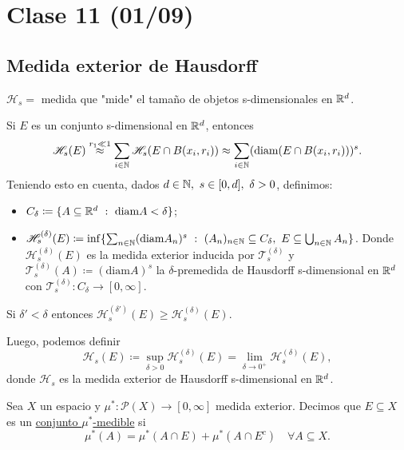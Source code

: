 \section{Clase 11 (01/09)}

\subsection*{Medida exterior de Hausdorff}

$\mathscr{H}_s =$ medida que "mide" el tamaño de objetos s-dimensionales en $\mathbb{R}^d$. \newline

Si $E$ es un conjunto s-dimensional en $\mathbb{R}^d$, entonces
\[
	\mathscr{H}_s (E) \stackrel{r_1 \ll 1}{\approx} \sum_{i\in\mathbb{N}} \mathscr{H}_s(E \cap B(x_i,r_i)) \approx \sum_{i\in\mathbb{N}} (\text{diam}(E \cap B(x_i,r_i)))^s
.\] 
Teniendo esto en cuenta, dados $d \in \mathbb{N},\ s \in [0,d],\ \delta > 0$, definimos:
\begin{itemize}
	\item $C_{\delta} \coloneq \{ A \subseteq \mathbb{R}^d \ : \ \text{diam}A < \delta \}$;

	\item $\mathscr{H}_{s}^{(\delta)} (E) \coloneq \inf \{ \sum_{n\in\mathbb{N}} (\text{diam}A_n)^s \ : \ (A_n)_{n\in\mathbb{N}} \subseteq C_{\delta},\ E \subseteq \bigcup_{n\in\mathbb{N}} A_n \}$. Donde $\mathscr{H}_{s}^{(\delta)} (E)$ es la medida exterior inducida por $\mathcal{T}_{s}^{(\delta)}$ y $\mathcal{T}_{s}^{(\delta)}(A) \coloneq (\text{diam}A)^s$ la $\delta$-premedida de Hausdorff s-dimensional en $\mathbb{R}^d$ con $\mathcal{T}_{s}^{(\delta)} : C_{\delta} \to [0,\infty]$.
\end{itemize}

\begin{observe}
	Si $\delta' < \delta$ entonces $\mathscr{H}_{s}^{(\delta')}(E) \geq \mathscr{H}_{s}^{(\delta)} (E)$.
\end{observe}

\noindent Luego, podemos definir
\[
	\mathscr{H}_s(E) \coloneq \sup_{\delta>0} \mathscr{H}_{s}^{(\delta)}(E) = \lim_{\delta \to 0^{+}} \mathscr{H}_{s}^{(\delta)} (E) 
,\] 
donde $\mathscr{H}_s$ es la medida exterior de Hausdorff s-dimensional en $\mathbb{R}^d$.

\begin{definition}
	Sea $X$ un espacio y $\mu^{*} : \mathcal{P}(X) \to [0,\infty]$ medida exterior. Decimos que $E \subseteq X$ es un \underline{conjunto $\mu^{*}$-medible} si
	\[
		\mu^{*}(A) = \mu^{*}(A \cap E) + \mu^{*}(A \cap E^c) \quad \forall A \subseteq X
	.\] 
\end{definition}

